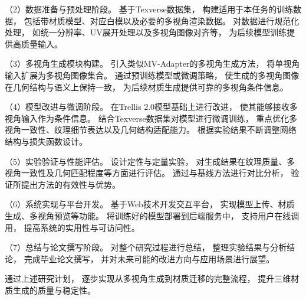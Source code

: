 （2）数据准备与预处理阶段。  
基于Texverse数据集\cite{zhang2025texverse}，  
构建适用于本任务的训练数据，  
包括带材质模型、对应白模以及必要的多视角渲染数据。  
对数据进行规范化处理，  
如统一分辨率、UV展开处理以及多视角图像对齐等，  
为后续模型训练提供高质量输入。  

（3）多视角生成模块构建。  
引入类似MV-Adapter\cite{huang2025mv}的多视角生成方法，  
将单视角输入扩展为多视角图像集合。  
通过预训练模型或微调策略，  
使生成的多视角图像在几何结构与语义上保持一致，  
为后续材质生成提供可靠的多视角条件信息。  

（4）模型改进与微调阶段。  
在Trellis 2.0\cite{xiang2025native}模型基础上进行改进，  
使其能够接收多视角输入作为条件信息。  
结合Texverse数据集对模型进行微调训练，  
重点优化多视角一致性、纹理细节表达以及几何结构适配能力。  
根据实验结果不断调整网络结构与损失函数设计。  

（5）实验验证与性能评估。  
设计定性与定量实验，  
对生成结果在纹理质量、多视角一致性及几何匹配程度等方面进行评估。  
通过与基线方法进行对比分析，  
验证所提出方法的有效性与优势。  

（6）系统实现与平台开发。  
基于Web技术开发交互平台，  
实现模型上传、材质生成、多视角预览等功能。  
将训练好的模型部署到后端服务中，  
支持用户在线调用，  
提高系统的实用性与可访问性。  

（7）总结与论文撰写阶段。  
对整个研究过程进行总结，  
整理实验结果与分析结论，  
完成毕业论文撰写，  
并对未来可能的改进方向与应用场景进行展望。  

通过上述研究计划，  
逐步实现从多视角生成到材质迁移的完整流程，  
提升三维材质生成的质量与稳定性。  

